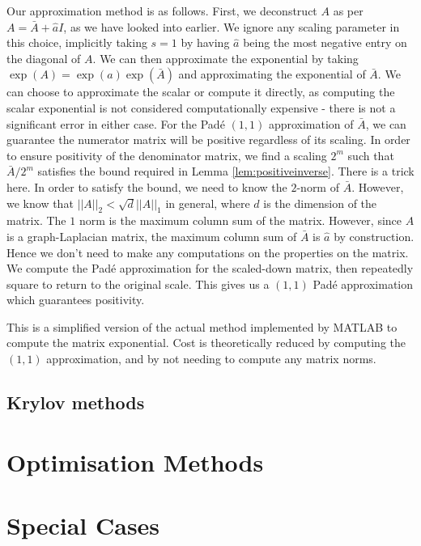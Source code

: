 Our approximation method is as follows.
First, we deconstruct $A$ as per $A = \bar{A} + \hat{a}I$, as we have looked into earlier.
We ignore any scaling parameter in this choice, implicitly taking $s=1$ by having $\hat{a}$ being the most negative entry on the diagonal of $A$.
We can then approximate the exponential by taking $\exp(A) = \exp(a)\exp(\bar{A})$ and approximating the exponential of $\bar{A}$.
We can choose to approximate the scalar or compute it directly, as computing the scalar exponential is not considered computationally expensive - there is not a significant error in either case.
For the Pad\'e $(1,1)$ approximation of $\bar{A}$, we can guarantee the numerator matrix will be positive regardless of its scaling.
In order to ensure positivity of the denominator matrix, we find a scaling $2^m$ such that $\bar{A}/2^m$ satisfies the bound required in Lemma \ref{lem:positiveinverse}.
There is a trick here. In order to satisfy the bound, we need to know the $2$-norm of $\bar{A}$.
However, we know that $||A||_2 < \sqrt{d}||A||_1$ in general, where $d$ is the dimension of the matrix.
The $1$ norm is the maximum column sum of the matrix. However, since $A$ is a graph-Laplacian matrix, the maximum column sum of $\bar{A}$ is $\hat{a}$ by construction.
Hence we don't need to make any computations on the properties on the matrix.
We compute the Pad\'e approximation for the scaled-down matrix, then repeatedly square to return to the original scale.
This gives us a $(1,1)$ Pad\'e approximation which guarantees positivity.

This is a simplified version of the actual method implemented by MATLAB to compute the matrix exponential.
Cost is theoretically reduced by computing the $(1,1)$ approximation,
and by not needing to compute any matrix norms.



\subsection{Krylov methods}

\section{Optimisation Methods}




\section{Special Cases}




